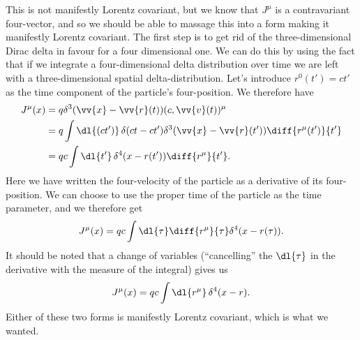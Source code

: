\documentclass[fleqn]{NotesClass}
\begin{document}
    This is not manifestly Lorentz covariant, but we know that \(J^\mu\) is a contravariant four-vector, and so we should be able to massage this into a form making it manifestly Lorentz covariant.
    The first step is to get rid of the three-dimensional Dirac delta in favour for a four dimensional one.
    We can do this by using the fact that if we integrate a four-dimensional delta distribution over time we are left with a three-dimensional spatial delta-distribution.
    Let's introduce \(r^0(t') = ct'\) as the time component of the particle's four-position.
    We therefore have
    \begin{align}
        J^\mu(x) &= q \delta^3(\vv{x} - \vv{r}(t))(c, \vv{v}(t))^\mu\\
        &= q \int \dl{(ct')} \, \delta(ct - ct') \delta^3(\vv{x} - \vv{r}(t')) \diff{r^\mu(t')}{t'}\\
        &= qc \int \dl{t'} \, \delta^4(x - r(t')) \diff{r^\mu}{t'}.
    \end{align}
    Here we have written the four-velocity of the particle as a derivative of its four-position.
    We can choose to use the proper time of the particle as the time parameter, and we therefore get
    \begin{equation}
        J^\mu(x) = qc \int \dl{\tau} \diff{r^\mu}{\tau} \delta^4(x - r(\tau)).
    \end{equation}
    It should be noted that a change of variables (\enquote{cancelling} the \(\dl{\tau}\) in the derivative with the measure of the integral) gives us
    \begin{equation}
        J^\mu(x) = qc \int \dl{r^\mu} \, \delta^4(x - r).
    \end{equation}
    Either of these two forms is manifestly Lorentz covariant, which is what we wanted.
    
\end{document}
